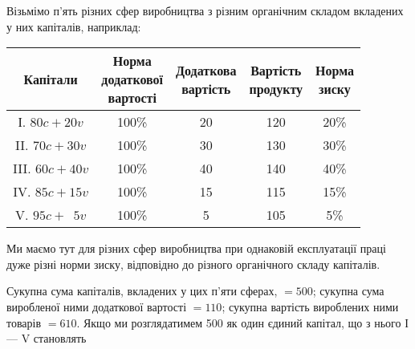 Візьмімо п’ять різних сфер виробництва з різним органічним
складом вкладених у них капіталів, наприклад:
  \begin{center}
  \begin{tabular}{c c c c c}
  \toprule
Капітали  &  \makecell{Норма\\додаткової\\вартості}  & \makecell{Додаткова \\вартість} & \makecell{Вартість\\продукту} & \makecell{Норма\\зиску}\\
  \midrule
\phantom{II}І. $80 c + 20 v$          &  100\% &   20            &  120 &   20\% \\
\phantom{I}II. $70 c + 30 v$          &  100\% &   30            &  130 &   30\% \\
III. $60 c + 40 v$                    &  100\% &   40            &  140 &   40\% \\
IV. $85 c + 15 v$                     &  100\% &   15            &  115 &   15\% \\
\phantom{I}V. $95 c + \phantom{0}5 v$ &  100\% &   \phantom{0}5  &  105 &   \phantom{0}5\% \\
  \end{tabular}
  \end{center}

Ми маємо тут для різних сфер виробництва при однаковій
експлуатації праці дуже різні норми зиску, відповідно до різного органічного складу капіталів.

Сукупна сума капіталів, вкладених у цих п’яти сферах, $= 500$;
сукупна сума виробленої ними додаткової вартості $= 110$; сукупна вартість вироблених ними товарів $=
610$. Якщо ми розглядатимем 500 як один єдиний капітал, що з нього І — V становлять
\parbreak{}  %
